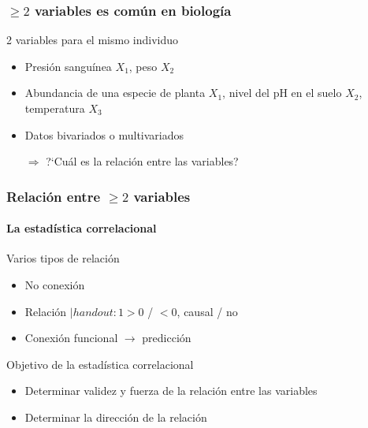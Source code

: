 \documentclass[gray,handout,mathserif]{beamer}
\begin{document}
 
\begin{frame}[label=regrprec]
   \frametitle{$\geq 2$ variables es com\'un en biolog\'ia}
   \begin{exampleblock}{2 variables para el mismo individuo}
      \begin{itemize}
         \item Presi\'on sangu\'inea $X_1$, peso $X_2$
         \item Abundancia de una especie de planta $X_1$, nivel del pH en el suelo $X_2$, temperatura $X_3$ 
      \end{itemize}
   \end{exampleblock}
   \begin{itemize}
      \item Datos \alert{bi}variados o \alert{multi}variados
      \medskip
      \item[$\Rightarrow$] ?`Cu\'al es la relaci\'on entre las variables?
   \end{itemize}
\end{frame}%


\begin{frame}[label=corroverv1]
   \frametitle{Relaci\'on entre $\geq 2$ variables}
   \framesubtitle{La estad\'istica correlacional}
   \begin{block}{Varios tipos de relaci\'on}
      \begin{itemize}
         \item No conexi\'on
         \item Relaci\'on $| handout:1>0$ / $<0$, causal / no
         \item Conexi\'on funcional $\rightarrow$ predicci\'on
      \end{itemize}
   \end{block}
   \begin{block}{Objetivo de la estad\'istica correlacional}
      \begin{itemize}
         \item Determinar validez y fuerza de la relaci\'on entre las variables
         \item Determinar la direcci\'on de la relaci\'on
      \end{itemize}
   \end{block}
\end{frame}%
\end{document}
